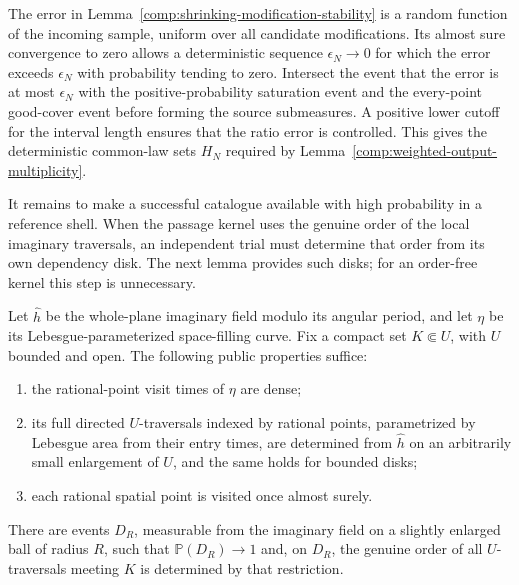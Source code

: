 \begin{remark}
\label{comp:deterministic-stability-errors}
The error in Lemma~\ref{comp:shrinking-modification-stability}
is a random function of the incoming sample, uniform over all
candidate modifications.  Its almost sure convergence to zero
allows a deterministic sequence $\epsilon_N\to0$ for which
the error exceeds $\epsilon_N$ with probability tending to
zero.  Intersect the event that the error is at most $\epsilon_N$ with
the positive-probability saturation event and the every-point
good-cover event before
forming the source submeasures.  A positive lower cutoff for
the interval length ensures that the ratio error is controlled.
This gives the deterministic common-law sets $H_N$ required
by Lemma~\ref{comp:weighted-output-multiplicity}.
\end{remark}

It remains to make a successful catalogue available with high
probability in a reference shell.  When the passage kernel uses the
genuine order of the local imaginary traversals, an independent trial
must determine that order from its own dependency disk.  The next lemma
provides such disks; for an order-free kernel this step is unnecessary.

\begin{lemma}
\label{comp:local-order-certificate}
Let $\widehat h$ be the whole-plane imaginary field modulo its
angular period, and let $\eta$ be its Lebesgue-parameterized
space-filling curve.  Fix a compact set $K\Subset U$, with $U$
bounded and open.  The following public properties suffice:
\begin{enumerate}[label=(\roman*)]
\item the rational-point visit times of $\eta$ are dense;
\item its full directed $U$-traversals indexed by rational points,
      parametrized by Lebesgue area from their entry times,
      are determined from $\widehat h$ on an arbitrarily small
      enlargement of $U$, and the same holds for bounded disks;
\item each rational spatial point is visited once almost surely.
\end{enumerate}
There are events $D_R$, measurable from the imaginary field on
a slightly enlarged ball of radius $R$, such that
$\mathbb P(D_R)\to1$ and, on $D_R$, the genuine order of all
$U$-traversals meeting $K$ is determined by that restriction.
\end{lemma}

